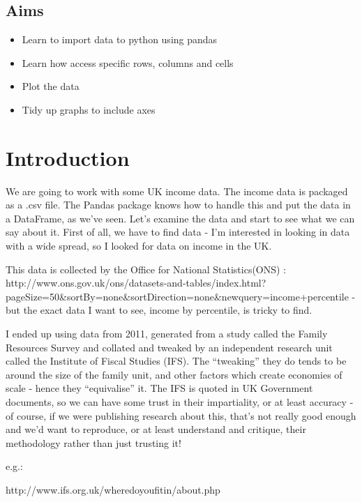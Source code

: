 \documentclass[
  letterpaper,
  DIV=11,
  numbers=noendperiod]{scrreprt}
\providecommand{\tightlist}{%
  \setlength{\itemsep}{0pt}\setlength{\parskip}{0pt}}\usepackage{longtable,booktabs,array}
\begin{document}
\hypertarget{aims}{%
\subsection{Aims}\label{aims}}

\begin{itemize}
\tightlist
\item
  Learn to import data to python using pandas
\item
  Learn how access specific rows, columns and cells
\item
  Plot the data
\item
  Tidy up graphs to include axes
\end{itemize}

\hypertarget{introduction}{%
\section{Introduction}\label{introduction}}

We are going to work with some UK income data. The income data is
packaged as a .csv file. The Pandas package knows how to handle this and
put the data in a DataFrame, as we've seen. Let's examine the data and
start to see what we can say about it. First of all, we have to find
data - I'm interested in looking in data with a wide spread, so I looked
for data on income in the UK.

This data is collected by the Office for National Statistics(ONS) :
http://www.ons.gov.uk/ons/datasets-and-tables/index.html?pageSize=50\&sortBy=none\&sortDirection=none\&newquery=income+percentile
- but the exact data I want to see, income by percentile, is tricky to
find.

I ended up using data from 2011, generated from a study called the
Family Resources Survey and collated and tweaked by an independent
research unit called the Institute of Fiscal Studies (IFS). The
``tweaking'' they do tends to be around the size of the family unit, and
other factors which create economies of scale - hence they
``equivalise'' it. The IFS is quoted in UK Government documents, so we
can have some trust in their impartiality, or at least accuracy - of
course, if we were publishing research about this, that's not really
good enough and we'd want to reproduce, or at least understand and
critique, their methodology rather than just trusting it!

e.g.:

http://www.ifs.org.uk/wheredoyoufitin/about.php
\end{document}
